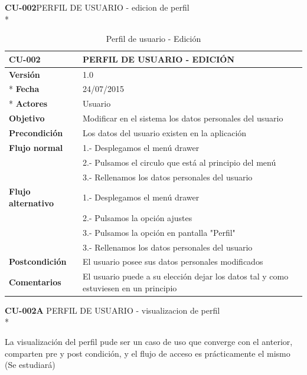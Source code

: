 \documentclass[../pfc.tex]{subfiles}
\begin{document}
	
	
	\textbf{CU-002}PERFIL DE USUARIO - edicion de perfil\\*
	
	\begin{table}[!hbt]
		\centering
		\begin{tabular}[t]{|p{3cm}|p{9.5cm}|}
			\hline \textbf{CU-002} & \textbf{PERFIL DE USUARIO - EDICIÓN} \\*
			\hline\hline \textbf{Versión} & 1.0 \\ *
			\hline\hline \textbf{Fecha} & 24/07/2015 \\ *
			\hline\textbf{Actores} 	& Usuario\\*
			\hline \textbf{Objetivo} & Modificar en el sistema los datos personales del usuario\\* 			
			\hline \textbf{Precondición} & Los datos del usuario existen en la aplicación \\* 
			\hline \textbf{Flujo normal} & 1.- Desplegamos el menú drawer \\* 
			& 2.- Pulsamos el circulo que está al principio del menú \\*	
			& 3.- Rellenamos los datos personales del usuario\\*	
			\hline \textbf{Flujo alternativo} & 1.- Desplegamos el menú drawer \\* 
			& 2.- Pulsamos la opción ajustes \\*	
			& 3.- Pulsamos la opción en pantalla "Perfil" \\*	
			& 3.- Rellenamos los datos personales del usuario \\*	
			\hline \textbf{Postcondición} & El usuario posee sus datos personales modificados\\* 
			\hline \textbf{Comentarios}   & El usuario puede a su elección dejar los datos tal y como estuviesen en un principio\\*
			\hline
		\end{tabular}
		\caption{Perfil de usuario - Edición}
		\label{tabla:caso002}
	\end{table}
	

	
	\textbf{CU-002A}	PERFIL DE USUARIO - visualizacion de perfil\\*

	La visualización del perfil pude ser un caso de uso que converge con el anterior, comparten pre y post condición, y el flujo de acceso es prácticamente el mismo (Se estudiará)

	
	
\end{document}
